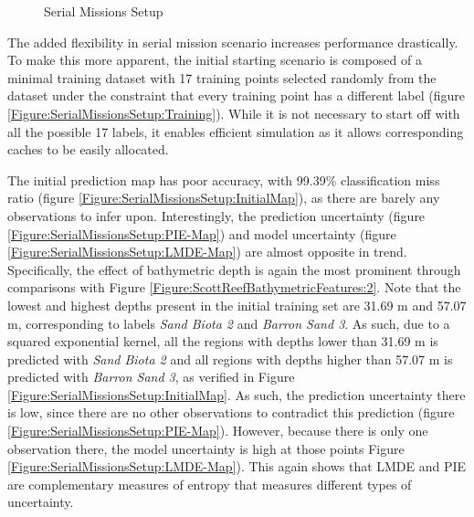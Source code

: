 			\begin{figure}[!htbp]
			\centering
			\caption{Serial Missions Setup}
			\label{Figure:SerialMissionsSetup}
			\end{figure}
			
			The added flexibility in serial mission scenario increases performance drastically. To make this more apparent, the initial starting scenario is composed of a minimal training dataset with 17 training points selected randomly from the dataset under the constraint that every training point has a different label (figure \ref{Figure:SerialMissionsSetup:Training}). While it is not necessary to start off with all the possible 17 labels, it enables efficient simulation as it allows corresponding caches to be easily allocated.
			
			The initial prediction map has poor accuracy, with 99.39\% classification miss ratio (figure \ref{Figure:SerialMissionsSetup:InitialMap}), as there are barely any observations to infer upon. Interestingly, the prediction uncertainty (figure \ref{Figure:SerialMissionsSetup:PIE-Map}) and model uncertainty (figure \ref{Figure:SerialMissionsSetup:LMDE-Map}) are almost opposite in trend. Specifically, the effect of bathymetric depth is again the most prominent through comparisons with Figure \ref{Figure:ScottReefBathymetricFeatures:2}. Note that the lowest and highest depths present in the initial training set are 31.69 m and 57.07 m, corresponding to labels \textit{Sand Biota 2} and \textit{Barron Sand 3}. As such, due to a squared exponential kernel, all the regions with depths lower than 31.69 m is predicted with \textit{Sand Biota 2} and all regions with depths higher than 57.07 m is predicted with \textit{Barron Sand 3}, as verified in Figure \ref{Figure:SerialMissionsSetup:InitialMap}. As such, the prediction uncertainty there is low, since there are no other observations to contradict this prediction (figure \ref{Figure:SerialMissionsSetup:PIE-Map}). However, because there is only one observation there, the model uncertainty is high at those points Figure \ref{Figure:SerialMissionsSetup:LMDE-Map}). This again shows that LMDE and PIE are complementary measures of entropy that measures different types of uncertainty.

